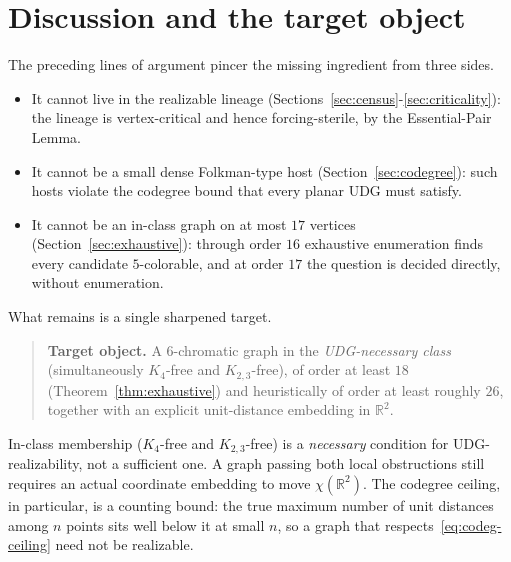 \documentclass[11pt]{article}
\theoremstyle{definition}
\newcommand{\R}{\mathbb{R}}
\newcommand{\chrom}{\chi}
\begin{document}
\section{Discussion and the target object}
\label{sec:discussion}

The preceding lines of argument pincer the missing ingredient from three
sides.
\begin{itemize}
  \item It cannot live in the realizable lineage
        (Sections~\ref{sec:census}-\ref{sec:criticality}): the lineage is
        vertex-critical and hence forcing-sterile, by the Essential-Pair Lemma.
  \item It cannot be a small dense Folkman-type host
        (Section~\ref{sec:codegree}): such hosts violate the codegree bound that
        every planar UDG must satisfy.
  \item It cannot be an in-class graph on at most $17$ vertices
        (Section~\ref{sec:exhaustive}): through order $16$ exhaustive
        enumeration finds every candidate $5$-colorable, and at order $17$ the
        question is decided directly, without enumeration.
\end{itemize}
What remains is a single sharpened target.

\begin{quote}
\textbf{Target object.} A $6$-chromatic graph in the \emph{UDG-necessary class}
(simultaneously $K_4$-free and $K_{2,3}$-free), of order at least $18$
(Theorem~\ref{thm:exhaustive}) and heuristically of order at least roughly
$26$, together with an explicit unit-distance embedding in $\R^2$.
\end{quote}

In-class membership ($K_4$-free and $K_{2,3}$-free) is a \emph{necessary}
condition for UDG-realizability, not a sufficient one. A graph passing both local
obstructions still requires an actual coordinate embedding to move
$\chrom(\R^2)$. The codegree ceiling, in particular, is a counting bound: the
true maximum number of unit distances among $n$ points sits well below it at small
$n$, so a graph that respects~\eqref{eq:codeg-ceiling} need not be realizable.
\end{document}
